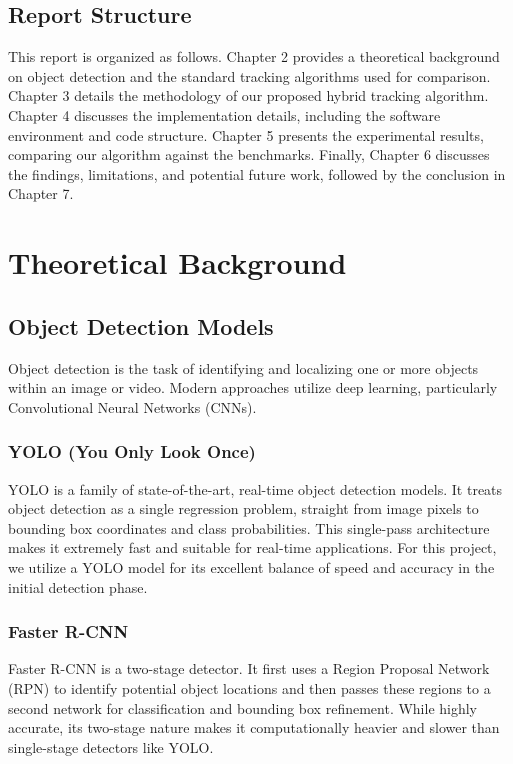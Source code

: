 \documentclass[12pt, a4paper]{report}
\begin{document}
\section{Report Structure}
This report is organized as follows. Chapter 2 provides a theoretical background on object detection and the standard tracking algorithms used for comparison. Chapter 3 details the methodology of our proposed hybrid tracking algorithm. Chapter 4 discusses the implementation details, including the software environment and code structure. Chapter 5 presents the experimental results, comparing our algorithm against the benchmarks. Finally, Chapter 6 discusses the findings, limitations, and potential future work, followed by the conclusion in Chapter 7.


\chapter{Theoretical Background}

\section{Object Detection Models}
Object detection is the task of identifying and localizing one or more objects within an image or video. Modern approaches utilize deep learning, particularly Convolutional Neural Networks (CNNs).

\subsection{YOLO (You Only Look Once)}
YOLO is a family of state-of-the-art, real-time object detection models. It treats object detection as a single regression problem, straight from image pixels to bounding box coordinates and class probabilities. This single-pass architecture makes it extremely fast and suitable for real-time applications. For this project, we utilize a YOLO model for its excellent balance of speed and accuracy in the initial detection phase.

\subsection{Faster R-CNN}
Faster R-CNN is a two-stage detector. It first uses a Region Proposal Network (RPN) to identify potential object locations and then passes these regions to a second network for classification and bounding box refinement. While highly accurate, its two-stage nature makes it computationally heavier and slower than single-stage detectors like YOLO.
\end{document}
